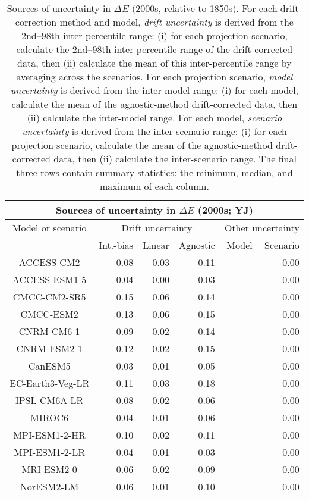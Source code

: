\begin{table*}[t]
\centering
\caption{Sources of uncertainty in $\Delta E$ (2000s, relative to 1850s). For each drift-correction method and model, \emph{drift uncertainty} is derived from the 2nd--98th inter-percentile range: (i) for each projection scenario, calculate the 2nd--98th inter-percentile range of the drift-corrected data, then (ii) calculate the mean of this inter-percentile range by averaging across the scenarios. For each projection scenario, \emph{model uncertainty} is derived from the inter-model range: (i) for each model, calculate the mean of the agnostic-method drift-corrected data, then (ii) calculate the inter-model range. For each model, \emph{scenario uncertainty} is derived from the inter-scenario range: (i) for each projection scenario, calculate the mean of the agnostic-method drift-corrected data, then (ii) calculate the inter-scenario range. The final three rows contain summary statistics: the minimum, median, and maximum of each column.}
\begin{tabular}{c|rrr|rr}
\toprule
\multicolumn{6}{c}{Sources of uncertainty in $\Delta E$ (2000s; YJ)} \\ 
\midrule
Model or scenario & \multicolumn{3}{c|}{Drift uncertainty} & \multicolumn{2}{c}{Other uncertainty} \\
 & Int.-bias & Linear & Agnostic & Model & Scenario \\
\midrule
ACCESS-CM2 & 0.08 & 0.03 & 0.11 &  & 0.00 \\
ACCESS-ESM1-5 & 0.04 & 0.00 & 0.03 &  & 0.00 \\
CMCC-CM2-SR5 & 0.15 & 0.06 & 0.14 &  & 0.00 \\
CMCC-ESM2 & 0.13 & 0.06 & 0.15 &  & 0.00 \\
CNRM-CM6-1 & 0.09 & 0.02 & 0.14 &  & 0.00 \\
CNRM-ESM2-1 & 0.12 & 0.02 & 0.15 &  & 0.00 \\
CanESM5 & 0.03 & 0.01 & 0.05 &  & 0.00 \\
EC-Earth3-Veg-LR & 0.11 & 0.03 & 0.18 &  & 0.00 \\
IPSL-CM6A-LR & 0.08 & 0.02 & 0.06 &  & 0.00 \\
MIROC6 & 0.04 & 0.01 & 0.06 &  & 0.00 \\
MPI-ESM1-2-HR & 0.10 & 0.02 & 0.11 &  & 0.00 \\
MPI-ESM1-2-LR & 0.04 & 0.01 & 0.03 &  & 0.00 \\
MRI-ESM2-0 & 0.06 & 0.02 & 0.09 &  & 0.00 \\
NorESM2-LM & 0.06 & 0.01 & 0.10 &  & 0.00 \\

\end{tabular}
\end{table*}
